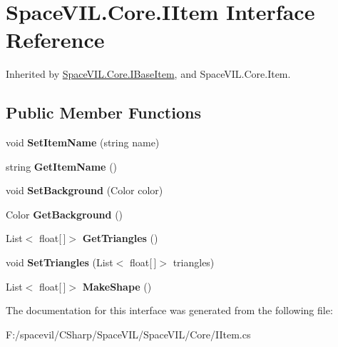 \hypertarget{interface_space_v_i_l_1_1_core_1_1_i_item}{}\section{Space\+V\+I\+L.\+Core.\+I\+Item Interface Reference}
\label{interface_space_v_i_l_1_1_core_1_1_i_item}


Inherited by \mbox{\hyperlink{interface_space_v_i_l_1_1_core_1_1_i_base_item}{Space\+V\+I\+L.\+Core.\+I\+Base\+Item}}, and Space\+V\+I\+L.\+Core.\+Item.

\subsection*{Public Member Functions}
\begin{DoxyCompactItemize}
\item 
\mbox{\label{interface_space_v_i_l_1_1_core_1_1_i_item_ada5e10f25cf0acda62a9f83184a04617}} 
void {\bfseries Set\+Item\+Name} (string name)
\item 
\mbox{\label{interface_space_v_i_l_1_1_core_1_1_i_item_a67b78de67aee0b0c8d7c356541619f43}} 
string {\bfseries Get\+Item\+Name} ()
\item 
\mbox{\label{interface_space_v_i_l_1_1_core_1_1_i_item_a6ef6ca119a20f020431423b37ec9dc44}} 
void {\bfseries Set\+Background} (Color color)
\item 
\mbox{\label{interface_space_v_i_l_1_1_core_1_1_i_item_a4a959d4143cd1c7af29d529d31e9818d}} 
Color {\bfseries Get\+Background} ()
\item 
\mbox{\label{interface_space_v_i_l_1_1_core_1_1_i_item_a0df7980826ba9f28f5db3860caee1546}} 
List$<$ float\mbox{[}$\,$\mbox{]}$>$ {\bfseries Get\+Triangles} ()
\item 
\mbox{\label{interface_space_v_i_l_1_1_core_1_1_i_item_af06da4b3b45e6ef2718d6d431bf1d868}} 
void {\bfseries Set\+Triangles} (List$<$ float\mbox{[}$\,$\mbox{]}$>$ triangles)
\item 
\mbox{\label{interface_space_v_i_l_1_1_core_1_1_i_item_a2291723c86bdcff51721758f724526e5}} 
List$<$ float\mbox{[}$\,$\mbox{]}$>$ {\bfseries Make\+Shape} ()
\end{DoxyCompactItemize}


The documentation for this interface was generated from the following file\+:\begin{DoxyCompactItemize}
\item 
F\+:/spacevil/\+C\+Sharp/\+Space\+V\+I\+L/\+Space\+V\+I\+L/\+Core/I\+Item.\+cs\end{DoxyCompactItemize}
